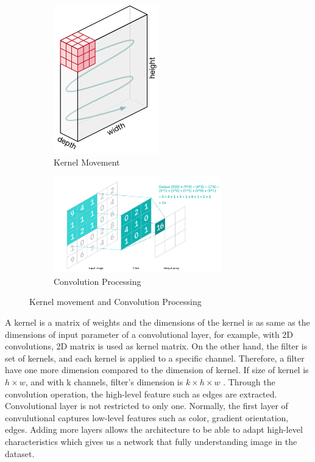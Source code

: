 \documentclass[a4paper, 12pt]{article}
\begin{document}
\begin{figure}[H]
    \begin{subfigure}[b]{0.5\textwidth}
        \centering
        \includegraphics[width=0.5\textwidth]{Movement of Kernel.png}
        \caption{Kernel Movement}
    \end{subfigure}
    \hfill
    \begin{subfigure}[b]{0.5\textwidth}
        \centering
        \includegraphics[width=0.8\textwidth]{Convolution process.png}
        \caption{Convolution Processing}
        \label{Convolution process}
    \end{subfigure}
    \hfill
    \caption{Kernel movement and Convolution Processing}
    \label{Figure CNN kernel and process}
\end{figure}

A kernel is a matrix of weights and the dimensions of the kernel is as same as the dimensions of input parameter of a convolutional layer, for example, with 2D convolutions, 2D matrix is used as kernel matrix. On the other hand, the filter is set of kernels, and each kernel is applied to a specific channel. Therefore, a filter have one more dimension compared to the dimension of kernel. If size of kernel is $h \times w$, and with k channels, filter's dimension is $k \times h \times w$ \citep{albawi2017understanding}. Through the convolution operation, the high-level feature such as edges are extracted. Convolutional layer is not restricted to only one. Normally, the first layer of convulutional captures low-level features such as color, gradient orientation, edges. Adding more layers allows the architecture to be able to adapt high-level characteristics which gives us a network that fully understanding image in the dataset.
\end{document}
